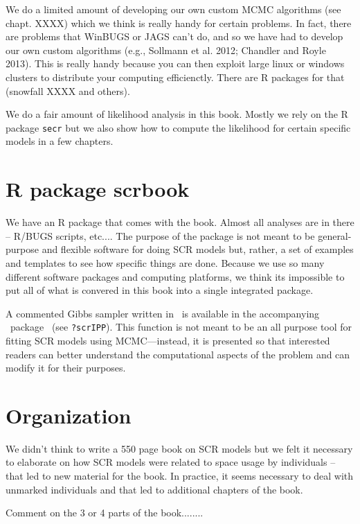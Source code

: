 We do a limited amount of developing our own custom MCMC algorithms
(see chapt. XXXX) which we think is really handy for certain
problems. In fact, there are problems that WinBUGS or JAGS can't do,
and so we have had to develop our own custom algorithms (e.g.,
Sollmann et al. 2012; Chandler and Royle 2013). This is really handy
because you can then exploit large linux or windows clusters to
distribute your computing efficienctly. There are R packages for that
(snowfall XXXX and others). 

We do a fair amount of likelihood analysis in this book. Mostly we
rely on the R package \mbox{\tt secr} \citep{efford_etal:2009euring}
but we also show how to compute the likelihood for certain specific
models in a few chapters.

\section{R package scrbook}

We have an R package that comes with the book. Almost all analyses are
in there -- R/BUGS scripts, etc....
The purpose of the package is  not meant to be general-purpose and
flexible software for doing SCR models but, rather, a set of examples
and templates to see how specific things are done.   Because we use so
many different software packages and computing platforms, we think its
impossible to put all of what is convered in this book into a single
integrated package. 


A commented Gibbs sampler written
in \R~is available in the accompanying \R~package \scrbook~(see
\texttt{?scrIPP}). This function is not meant to be an all purpose
tool for fitting SCR models using MCMC---instead, it is presented so
that interested readers can better understand the computational
aspects of the problem and can modify it for their purposes.



\section{Organization}


We didn't
think to write a 550 page book on SCR models but we felt it necessary
to elaborate on how SCR models were related to space usage by
individuals -- that led to new material for the book. In practice, it
seems necessary to deal with unmarked individuals and that led to
additional chapters of the book.

Comment on the 3 or 4 parts of the book........

